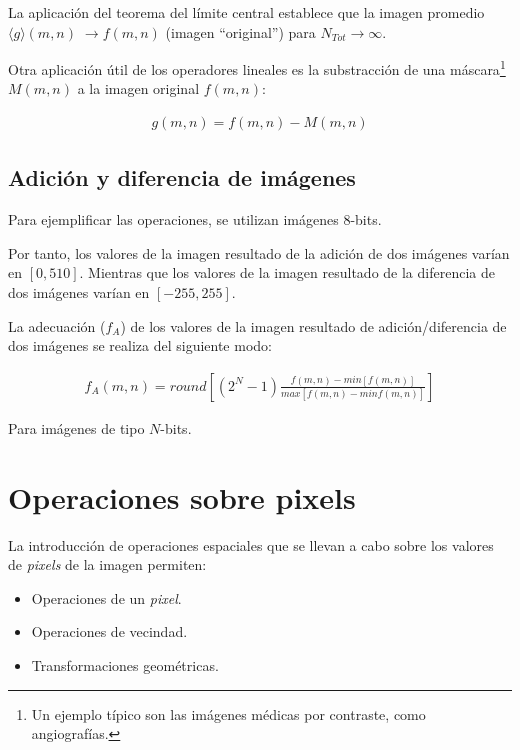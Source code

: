 La aplicaci\'on del teorema del l\'imite central establece que la imagen promedio $\langle g \rangle (m, n) \; \rightarrow f(m, n)$ (imagen ``original'') 
para $N_{Tot} \rightarrow \infty$.
%

%
Otra aplicaci\'on \'util de los operadores lineales es la substracci\'on de una m\'ascara\footnote{Un ejemplo t\'ipico son las im\'agenes m\'edicas por 
contraste, como angiograf\'ias.} $M(m, n)$ a la imagen original $f(m, n)$:

\begin{eqnarray}
	g (m, n) = f(m, n) - M(m, n)
\label{EqXXXIX}
\end{eqnarray}


\subsection{Adici\'on y diferencia de im\'agenes}

Para ejemplificar las operaciones, se utilizan im\'agenes 8-bits.
%

%
Por tanto, los valores de la imagen resultado de la adici\'on de dos im\'agenes var\'ian en $[0, 510]$.
%
Mientras que los valores de la imagen resultado de la diferencia de dos im\'agenes var\'ian en $[-255, 255]$.
%

%
La adecuaci\'on ($f_{A}$) de los valores de la imagen resultado de adici\'on/diferencia de dos im\'agenes se realiza del siguiente modo:

\begin{eqnarray}
	f_{A} (m, n) = round \left[ \left( 2^{N} - 1 \right) 
                \frac{f(m, n) - min{ \left[ f(m, n) \right] }}{max{ \left[ f(m, n) - min{f(m, n)} \right] }} \right] 
\label{EqXL}
\end{eqnarray}

Para im\'agenes de tipo $N$-bits.

\section{Operaciones sobre pixels}

La introducci\'on de operaciones espaciales que se llevan a cabo sobre los valores de \textit{pixels} de la imagen permiten:

\begin{itemize}
 \item Operaciones de un \textit{pixel}.
 \item Operaciones de vecindad.
 \item Transformaciones geom\'etricas.
\end{itemize}


